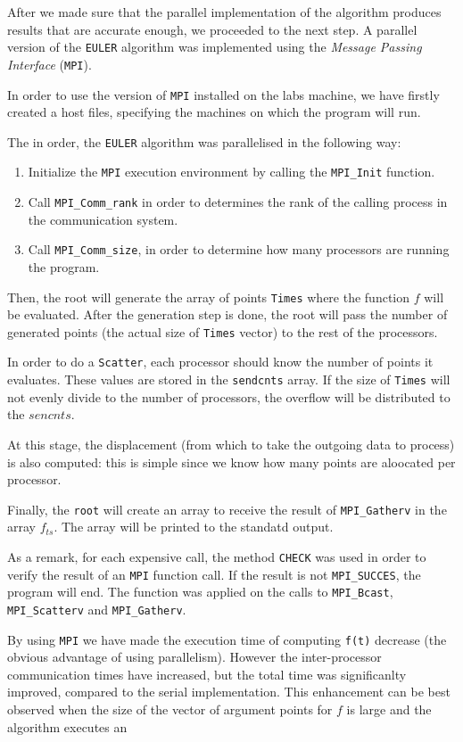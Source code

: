 After we made sure that the parallel implementation of the algorithm produces results that
are accurate enough, we proceeded to the next step.
A parallel version of the \texttt{EULER} algorithm was implemented using the \emph{Message Passing Interface} (\texttt{MPI}).

In order to use the version of \texttt{MPI} installed on the labs machine, we have firstly created a host files,
specifying  the machines on which the program will run.

The in order, the \texttt{EULER} algorithm was parallelised in the following way:
\begin{enumerate}
 \item{Initialize the \texttt{MPI} execution environment by calling the \texttt{MPI\_Init} function.}
 \item{Call \texttt{MPI\_Comm\_rank} in order to determines the rank of the calling process in the communication system.}
 \item{Call \texttt{MPI\_Comm\_size}, in order to determine how many processors are running the program.}
\end{enumerate}

Then, the root will generate the array of points \texttt{Times} where the function $f$ will be evaluated.
After the generation step is done, the root will pass the number of generated points (the actual size of 
\texttt{Times} vector) to the rest of the processors.
\newline

In order to do a \texttt{Scatter}, each processor should know the number of points it evaluates. These
values are stored in the \texttt{sendcnts} array. If the size of \texttt{Times} will not evenly divide to the
number of processors, the overflow will be distributed to the $sencnts$.

At this stage, the displacement (from which to take the outgoing data to process) is also computed: 
this is simple since we know how many points are aloocated per processor.


Finally, the \texttt{root} will create an array to receive the result of \texttt{MPI\_Gatherv} in the array $f_{ts}$.
The array will be printed to the standatd output.

As a remark, for each expensive call, the method \texttt{CHECK} was used in order to verify the result of an \texttt{MPI} function call. 
If the result is not \texttt{MPI\_SUCCES}, the program will end. The function was applied on the calls to \texttt{MPI\_Bcast}, \texttt{MPI\_Scatterv}  and \texttt{MPI\_Gatherv}.

By using \texttt{MPI} we have made the execution time of computing \texttt{f(t)} decrease (the obvious advantage of using parallelism). 
However the inter-processor communication times have increased, but the total time was significanlty improved, compared
to the serial implementation. This enhancement can be best observed when the size of the vector of argument points for $f$ is large and the algorithm executes an


